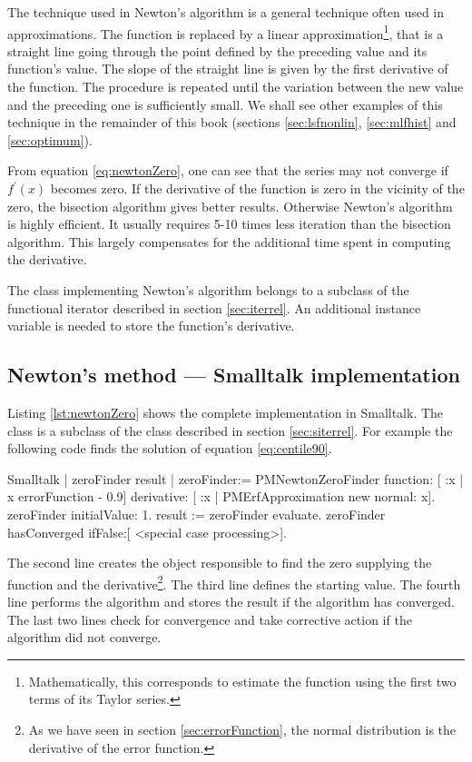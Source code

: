 The technique used in Newton's algorithm is a general technique
often used in approximations. The function is replaced by a linear
approximation\footnote{Mathematically, this corresponds to
estimate the function using the first two terms of its Taylor
series.}, that is a straight line going through the point defined
by the preceding value and its function's value. The slope of the
straight line is given by the first derivative of the function.
The procedure is repeated until the variation between the new
value and the preceding one is sufficiently small.
We shall see other examples of this technique in the remainder of this book
(\cf sections \ref{sec:lsfnonlin}, \ref{sec:mlfhist} and
\ref{sec:optimum}).

From equation \ref{eq:newtonZero}, one can see that the series may
not converge if $f^{\prime}\left(x\right)$ becomes zero. If the
derivative of the function is zero in the vicinity of the zero,
the bisection algorithm gives better results. Otherwise Newton's
algorithm is highly efficient. It usually requires 5-10 times less
iteration than the bisection algorithm. This largely compensates
for the additional time spent in computing the derivative.

The class implementing Newton's algorithm belongs to a subclass of
the functional iterator described in section \ref{sec:iterrel}. An
additional instance variable is needed to store the function's
derivative.

\subsection{Newton's method --- Smalltalk implementation}
\label{sec:snewton} Listing \ref{lst:newtonZero} shows the complete
implementation in Smalltalk. The class 
is a subclass of the class  described
in section \ref{sec:siterrel}. For example the following code
finds the solution of equation \ref{eq:centile90}.

\begin{displaycode}{Smalltalk}
| zeroFinder result |
zeroFinder:= PMNewtonZeroFinder
            function: [ :x | x errorFunction - 0.9]
            derivative: [ :x | PMErfApproximation new normal: x].
zeroFinder initialValue: 1.
result := zeroFinder evaluate.
zeroFinder hasConverged
   ifFalse:[ <special case processing>].
\end{displaycode}
The second line creates the object responsible to find the zero
supplying the function and the derivative\footnote{As we have seen
in section \ref{sec:errorFunction}, the normal distribution is the
derivative of the error function.}. The third line defines the
starting value. The fourth line performs the algorithm and stores
the result if the algorithm has converged. The last two lines
check for convergence and take corrective action if the algorithm
did not converge.

